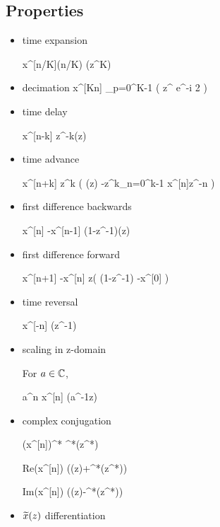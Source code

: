 \subsection{Properties}
\begin{itemize}
\item time expansion

\beq
x^{[n/K]}\indi(n/K\in\ZZ)
\maparrow{\calz}
(z^K)
\eeq

\item decimation
\beq
x^{[Kn]}
\maparrow{\calz}
\sum_{p=0}^{K-1}
\left(
z^{}
e^{-i 2\pi {}}
\right)
\eeq

\item time delay

\beq
x^{[n-k]}
\maparrow{\calz}
z^{-k}(z) 
\quad {}
\eeq

\item time advance

\beq
x^{[n+k]}
\maparrow{\calz}
z^{k}
\left(
(z)
-z^k\sum_{n=0}^{k-1}
x^{[n]}z^{-n}
\right)
\quad {}
\eeq

\item first difference backwards

\beq
x^{[n]}
-x^{[n-1]}
\maparrow{\calz}
(1-z^{-1})(z)
\eeq

\item first difference forward

\beq
x^{[n+1]}
-x^{[n]}
\maparrow{\calz}
z\left( (1-z^{-1})
 -x^{[0]}
\right)
\eeq  

\item time reversal

\beq
x^{[-n]}
\maparrow{\calz}
(z^{-1})
\eeq

\item scaling in z-domain

For $a\in{ \mathbb{C}}$,

\beq
a^n x^{[n]}
\maparrow{\calz}
(a^{-1}z)
\eeq

\item complex conjugation

\beq
(x^{[n]})^*
\maparrow{\calz} ^*(z^*)
\eeq

\beq
Re(x^{[n]})
\maparrow{\calz}
((z)+^*(z^*))
\eeq

\beq
Im(x^{[n]})
\maparrow{\calz}
((z)-^*(z^*))
\eeq

\item ${\widetilde{x}}(z)$ differentiation


\end{itemize}
